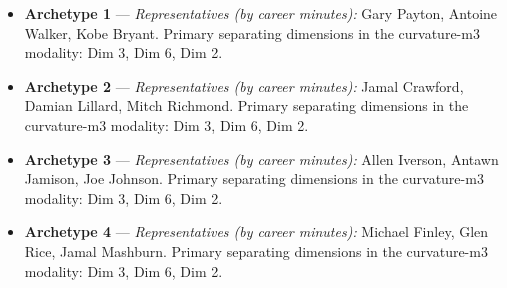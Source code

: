 \begin{itemize}
\item \textbf{Archetype 1} --- \emph{Representatives (by career minutes):} Gary Payton, Antoine Walker, Kobe Bryant. Primary separating dimensions in the curvature-m3 modality: Dim 3, Dim 6, Dim 2.
\item \textbf{Archetype 2} --- \emph{Representatives (by career minutes):} Jamal Crawford, Damian Lillard, Mitch Richmond. Primary separating dimensions in the curvature-m3 modality: Dim 3, Dim 6, Dim 2.
\item \textbf{Archetype 3} --- \emph{Representatives (by career minutes):} Allen Iverson, Antawn Jamison, Joe Johnson. Primary separating dimensions in the curvature-m3 modality: Dim 3, Dim 6, Dim 2.
\item \textbf{Archetype 4} --- \emph{Representatives (by career minutes):} Michael Finley, Glen Rice, Jamal Mashburn. Primary separating dimensions in the curvature-m3 modality: Dim 3, Dim 6, Dim 2.
\end{itemize}
